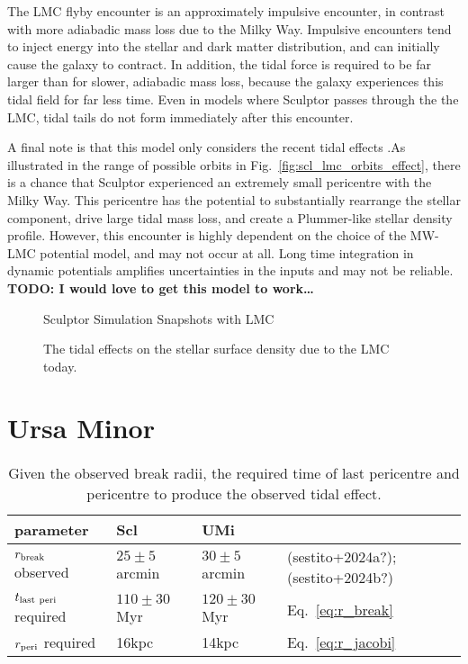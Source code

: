 The LMC flyby encounter is an approximately impulsive encounter, in
contrast with more adiabadic mass loss due to the Milky Way. Impulsive
encounters tend to inject energy into the stellar and dark matter
distribution, and can initially cause the galaxy to contract. In
addition, the tidal force is required to be far larger than for slower,
adiabadic mass loss, because the galaxy experiences this tidal field for
far less time. Even in models where Sculptor passes through the the LMC,
tidal tails do not form immediately after this encounter.

A final note is that this model only considers the recent tidal effects
.As illustrated in the range of possible orbits in
Fig.~\ref{fig:scl_lmc_orbits_effect}, there is a chance that Sculptor
experienced an extremely small pericentre with the Milky Way. This
pericentre has the potential to substantially rearrange the stellar
component, drive large tidal mass loss, and create a Plummer-like
stellar density profile. However, this encounter is highly dependent on
the choice of the MW-LMC potential model, and may not occur at all. Long
time integration in dynamic potentials amplifies uncertainties in the
inputs and may not be reliable. \textbf{TODO: I would love to get this
model to work\ldots{}}

\begin{figure}
\centering
{}
\caption{Sculptor Simulation Snapshots with
LMC}\label{fig:scl_lmc_sim_images}
\end{figure}

\begin{figure}
\centering
{}
\caption[Sculptor initial and final density with LMC]{The tidal effects
on the stellar surface density due to the LMC
today.}\label{fig:scl_lmc_i_f}
\end{figure}

\section{Ursa Minor}\label{ursa-minor}

\begin{table*}[t]
\centering
\caption{Given the observed break radii, the required time of last pericentre and pericentre to produce the observed tidal effect.}
\begin{tabular}{llll}
\toprule
parameter & Scl & UMi & \\
\midrule
$r_{\rm break}$ observed & $25 \pm 5$ arcmin & $30 \pm 5$ arcmin & (sestito+2024a?); (sestito+2024b?)\\
$t_{\rm last\ peri}$ required & $110\pm30$ Myr & $120\pm30$ Myr & Eq. \ref{eq:r_break}\\
$r_{\rm peri}$ required & 16kpc & 14kpc & Eq. \ref{eq:r_jacobi}\\
\bottomrule
\end{tabular}
\end{table*}


